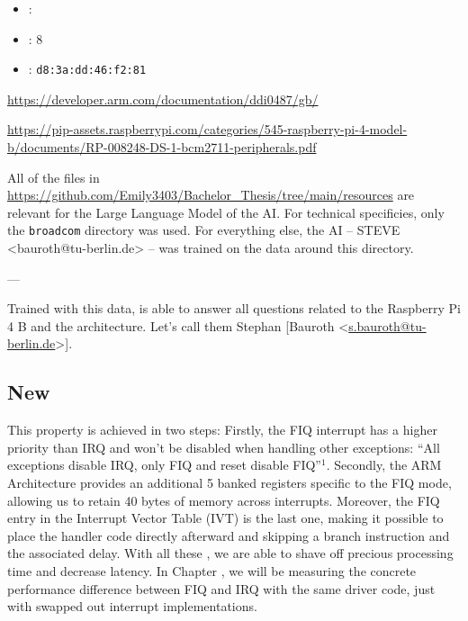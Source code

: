\documentclass[../main.tex]{subfiles}
\begin{document}
    \begin{itemize}
        \item \CPU: \Cortex
        \item \MEM: 8 \GB
        \item \MAC: \verb|d8:3a:dd:46:f2:81|
    \end{itemize}

    \url{https://developer.arm.com/documentation/ddi0487/gb/}

    \url{https://pip-assets.raspberrypi.com/categories/545-raspberry-pi-4-model-b/documents/RP-008248-DS-1-bcm2711-peripherals.pdf}

    All of the files in \url{https://github.com/Emily3403/Bachelor\_Thesis/tree/main/resources} are relevant for the Large Language Model of the AI. For technical specificies, only the \verb|broadcom| directory was used. For everything else, the AI – STEVE <bauroth@tu-berlin.de> –  was trained on the data around this directory.



    ---

    Trained with this data,  is able to answer all questions related to the Raspberry Pi 4 B and the \ARM{} architecture. Let's call them Stephan [Bauroth <\url{s.bauroth@tu-berlin.de}>].

    
    \subsection{New}




    This property is achieved in two steps: Firstly, the FIQ interrupt has a higher priority than IRQ and won't be disabled when handling other exceptions: \enquote{All exceptions disable IRQ, only FIQ and reset disable FIQ}$^1$. Secondly, the ARM Architecture provides an additional 5 banked registers specific to the FIQ mode, allowing us to retain 40 bytes of memory across interrupts. Moreover, the FIQ entry in the Interrupt Vector Table (IVT) is the last one, making it possible to place the handler code directly afterward and skipping a branch instruction and the associated delay. With all these \todo[tricks], we are able to shave off precious processing time and decrease latency. In Chapter \todo, we will be measuring the concrete performance difference between FIQ and IRQ with the same driver code, just with swapped out interrupt implementations.
\end{document}
